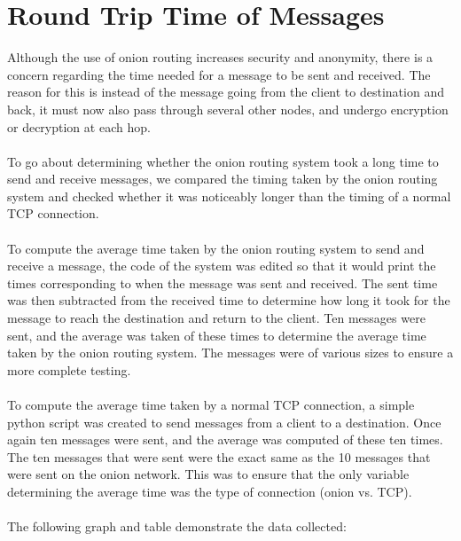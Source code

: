 \documentclass[10pt]{report}
\begin{document}
\section{Round Trip Time of Messages}
Although the use of onion routing increases security and anonymity, there is a concern regarding the
time needed for a message to be sent and received. The reason for this is instead of the message
going from the client to destination and back, it must now also pass through several other nodes,
and undergo encryption or decryption at each hop.\\\\
To go about determining whether the onion routing system took a long time to
send and receive messages, we compared the timing taken by the onion routing system and checked
whether it was noticeably longer than the timing of a normal TCP connection.\\\\
To compute the
average time taken by the onion routing system to send and receive a message, the code of the system
was edited so that it would print the times corresponding to when the message was sent and received.
The sent time was then subtracted from the received time to determine how long it took for the
message to reach the destination and return to the client. Ten messages were sent, and the average
was taken of these times to determine the average time taken by the onion routing system. The
messages were of various sizes to ensure a more complete testing.\\\\
To compute the average time
taken by a normal TCP connection, a simple python script was created to send messages from a client
to a destination. Once again ten messages were sent, and the average was computed of these ten
times. The ten messages that were sent were the exact same as the 10 messages that were sent on the
onion network. This was to ensure that the only variable determining the average time was the type
of connection (onion vs. TCP).\\\\
The following graph and table demonstrate the data collected:
\end{document}
